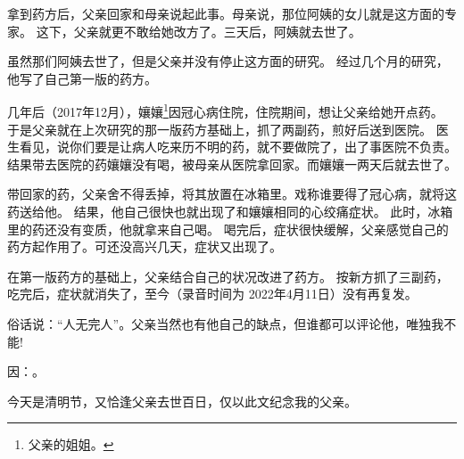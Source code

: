 拿到药方后，父亲回家和母亲说起此事。母亲说，那位阿姨的女儿就是这方面的专家。
这下，父亲就更不敢给她改方了。三天后，阿姨就去世了。

虽然那们阿姨去世了，但是父亲并没有停止这方面的研究。
经过几个月的研究，他写了自己第一版的药方。

几年后（2017年12月），孃孃\footnote{父亲的姐姐。}因冠心病住院，住院期间，想让父亲给她开点药。
于是父亲就在上次研究的那一版药方基础上，抓了两副药，煎好后送到医院。
医生看见，说你们要是让病人吃来历不明的药，就不要做院了，出了事医院不负责。
结果带去医院的药孃孃没有喝，被母亲从医院拿回家。而孃孃一两天后就去世了。

带回家的药，父亲舍不得丢掉，将其放置在冰箱里。戏称谁要得了冠心病，就将这药送给他。
结果，他自己很快也就出现了和孃孃相同的心绞痛症状。
此时，冰箱里的药还没有变质，他就拿来自己喝。
喝完后，症状很快缓解，父亲感觉自己的药方起作用了。可还没高兴几天，症状又出现了。

在第一版药方的基础上，父亲结合自己的状况改进了药方。
按新方抓了三副药，吃完后，症状就消失了，至今（录音时间为 2022年4月11日）没有再复发。


\contentsep

俗话说：“人无完人”。父亲当然也有他自己的缺点，但谁都可以评论他，唯独我不能!

因：。

今天是清明节，又恰逢父亲去世百日，仅以此文纪念我的父亲。
